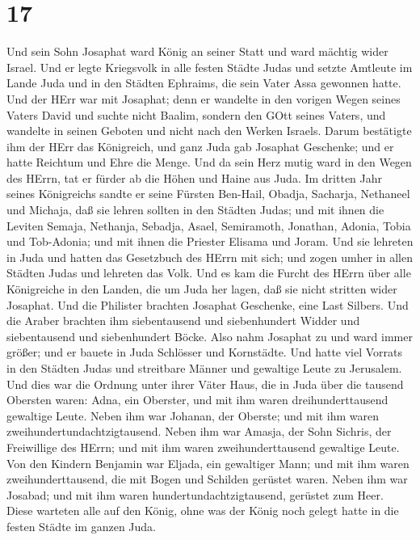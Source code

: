 \hypertarget{section-16}{%
\section{17}\label{section-16}}

 Und sein Sohn Josaphat ward König an seiner Statt und ward
mächtig wider Israel.  Und er legte Kriegsvolk in alle
festen Städte Judas und setzte Amtleute im Lande Juda und in den Städten
Ephraims, die sein Vater Assa gewonnen hatte.  Und der HErr
war mit Josaphat; denn er wandelte in den vorigen Wegen seines Vaters
David und suchte nicht Baalim,  sondern den GOtt seines
Vaters, und wandelte in seinen Geboten und nicht nach den Werken
Israels.  Darum bestätigte ihm der HErr das Königreich, und
ganz Juda gab Josaphat Geschenke; und er hatte Reichtum und Ehre die
Menge.  Und da sein Herz mutig ward in den Wegen des HErrn,
tat er fürder ab die Höhen und Haine aus Juda.  Im dritten
Jahr seines Königreichs sandte er seine Fürsten Ben-Hail, Obadja,
Sacharja, Nethaneel und Michaja, daß sie lehren sollten in den Städten
Judas;  und mit ihnen die Leviten Semaja, Nethanja, Sebadja,
Asael, Semiramoth, Jonathan, Adonia, Tobia und Tob-Adonia; und mit ihnen
die Priester Elisama und Joram.  Und sie lehreten in Juda
und hatten das Gesetzbuch des HErrn mit sich; und zogen umher in allen
Städten Judas und lehreten das Volk.  Und es kam die Furcht
des HErrn über alle Königreiche in den Landen, die um Juda her lagen,
daß sie nicht stritten wider Josaphat.  Und die Philister
brachten Josaphat Geschenke, eine Last Silbers. Und die Araber brachten
ihm siebentausend und siebenhundert Widder und siebentausend und
siebenhundert Böcke.  Also nahm Josaphat zu und ward immer
größer; und er bauete in Juda Schlösser und Kornstädte. 
Und hatte viel Vorrats in den Städten Judas und streitbare Männer und
gewaltige Leute zu Jerusalem.  Und dies war die Ordnung
unter ihrer Väter Haus, die in Juda über die tausend Obersten waren:
Adna, ein Oberster, und mit ihm waren dreihunderttausend gewaltige
Leute.  Neben ihm war Johanan, der Oberste; und mit ihm
waren zweihundertundachtzigtausend.  Neben ihm war Amasja,
der Sohn Sichris, der Freiwillige des HErrn; und mit ihm waren
zweihunderttausend gewaltige Leute.  Von den Kindern
Benjamin war Eljada, ein gewaltiger Mann; und mit ihm waren
zweihunderttausend, die mit Bogen und Schilden gerüstet waren.
 Neben ihm war Josabad; und mit ihm waren
hundertundachtzigtausend, gerüstet zum Heer.  Diese
warteten alle auf den König, ohne was der König noch gelegt hatte in die
festen Städte im ganzen Juda.

